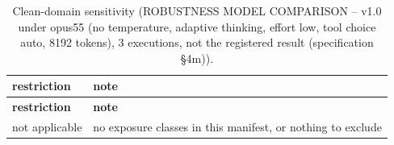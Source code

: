 \begingroup\footnotesize
\begin{longtable}{>{\raggedright\arraybackslash}p{126.4pt}>{\raggedright\arraybackslash}p{304.6pt}}
\caption{Clean-domain sensitivity (ROBUSTNESS MODEL COMPARISON -- v1.0 under opus55 (no temperature, adaptive thinking, effort low, tool choice auto, 8192 tokens), 3 executions, not the registered result (specification §4m)).} \\
\toprule
\textbf{restriction} & \textbf{note} \\
\midrule
\endfirsthead
\toprule
\textbf{restriction} & \textbf{note} \\
\midrule
\endhead
\bottomrule
\endfoot
not applicable & no exposure classes in this manifest, or nothing to exclude \\
\end{longtable}
\endgroup
